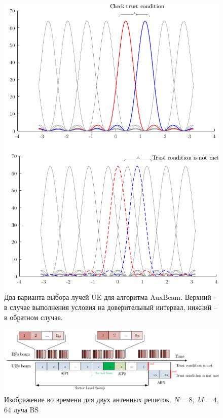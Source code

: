 \begin{figure}[h!]
    \centering
    \includegraphics{figs/fig4.16}
    \caption{Два варианта выбора лучей UE для алгоритма AuxBeam. Верхний -- в случае выполнения условия на доверительный интервал, нижний -- в обратном случае.}
    \label{fig:4.17}
\end{figure}


\begin{figure}[h!]
    \centering
    \includegraphics[width=\linewidth]{figs/fig4.17}
    \caption{Изображение \AuxBeam{} во времени для двух антенных решеток. $N=8$, $M=4$, 64 луча BS}
    \label{fig:timeline:auxbeam}
\end{figure}

